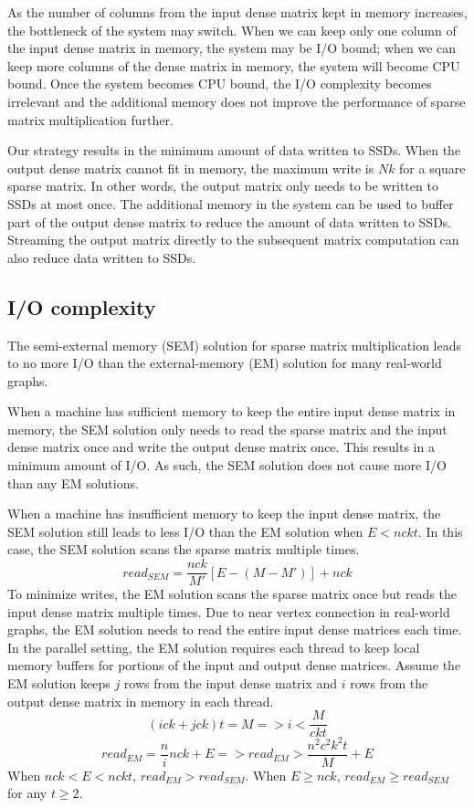 As the number of columns from the input dense matrix kept in memory increases,
the bottleneck of the system
may switch. When we can keep only one column of the input dense matrix in memory,
the system may be I/O bound; when we can keep more columns of the dense matrix
in memory, the system will become CPU bound. Once the system becomes CPU bound,
the I/O complexity becomes irrelevant and the additional memory does not improve
the performance of sparse matrix multiplication further.

Our strategy results in the minimum amount of data written to SSDs. When the output
dense matrix cannot fit in memory, the maximum write is $N k$ for a square
sparse matrix.
In other words, the output matrix only needs to be written to SSDs at most once.
The additional memory in the system can be used to buffer part of the output
dense matrix to reduce the amount of data written to SSDs. Streaming the output
matrix directly to the subsequent matrix computation can also reduce data written
to SSDs.

\subsection{I/O complexity}
The semi-external memory (SEM) solution for sparse matrix multiplication leads
to no more I/O than the external-memory (EM) solution for many real-world graphs.

When a machine has sufficient memory to keep the entire input dense matrix
in memory, the SEM solution only needs to read the sparse matrix and the input
dense matrix once and write the output dense matrix once. This results in
a minimum amount of I/O. As such, the SEM solution does not cause more I/O
than any EM solutions.

When a machine has insufficient memory to keep the input dense matrix, the SEM
solution still leads to less I/O than the EM solution when
$E < n c k t$.
In this case, the SEM solution scans the sparse matrix multiple times.
\begin{equation*}
read_{SEM} = \frac{n c k}{M'} [E - (M - M')] + n c k
\end{equation*}
To minimize writes, the EM solution
scans the sparse matrix once but reads the input dense matrix multiple times.
Due to near vertex connection in real-world graphs, the EM solution needs to
read the entire input dense matrices each time. In the parallel setting,
the EM solution requires each thread to keep local memory buffers for portions
of the input and output dense matrices. Assume the EM solution keeps $j$ rows
from the input dense matrix and $i$ rows from the output dense matrix in memory
in each thread.
\begin{equation*}
(i c k + j c k) t = M => i < \frac{M}{c k t}
\end{equation*}
\begin{equation*}
read_{EM} = \frac{n}{i} n c k + E =>  read_{EM} > \frac{n^2 c^2 k^2 t}{M} + E
\end{equation*}
When $n c k < E < n c k t$, $read_{EM} > read_{SEM}$.
When $E \geq n c k$, $read_{EM} \geq read_{SEM}$ for any $t \geq 2$.

